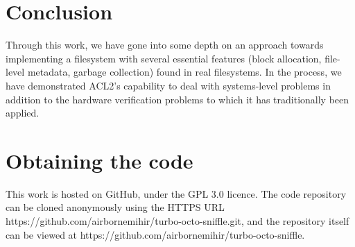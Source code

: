 \documentclass[format=sigconf,review=true]{acmart}
\begin{document}
\section{Conclusion}
Through this work, we have gone into some depth on an approach towards
implementing a filesystem with several essential features (block
allocation, file-level metadata, garbage collection) found in real
filesystems. In the process, we have demonstrated ACL2's capability to
deal with systems-level problems in addition to the hardware
verification problems to which it has traditionally been applied.

\section{Obtaining the code}
This work is hosted on GitHub, under the GPL 3.0 licence. The code
repository can be cloned anonymously using the HTTPS URL
https://github.com/airbornemihir/turbo-octo-sniffle.git, and the
repository itself can be viewed at
https://github.com/airbornemihir/turbo-octo-sniffle.



\end{document}
